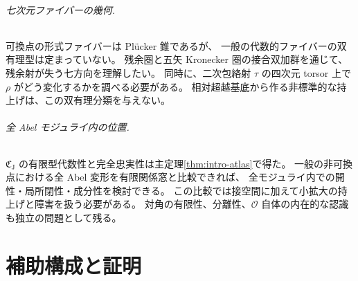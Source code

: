 \documentclass[11pt,a4paper]{ltjsarticle}
\numberwithin{equation}{section}
\begin{document}
\paragraph{七次元ファイバーの幾何.}
可換点の形式ファイバーは Pl\"ucker 錐であるが、
一般の代数的ファイバーの双有理型は定まっていない。
残余圏と五矢 Kronecker 圏の接合双加群を通じて、
残余射が失う七方向を理解したい。
同時に、二次包絡射 $\tau$ の四次元 torsor 上で $\rho$ がどう変化するかを調べる必要がある。
相対超越基底から作る非標準的な持上げは、この双有理分類を与えない。

\paragraph{全 Abel モジュライ内の位置.}
$\mathfrak C_{\mathrm J}$ の有限型代数性と完全忠実性は主定理\ref{thm:intro-atlas}で得た。
一般の非可換点における全 Abel 変形を有限関係窓と比較できれば、
全モジュライ内での開性・局所閉性・成分性を検討できる。
この比較では接空間に加えて小拡大の持上げと障害を扱う必要がある。
対角の有限性、分離性、$\mathcal O$ 自体の内在的な認識も独立の問題として残る。

\appendix
\clearpage
\part{補助構成と証明}












\end{document}
